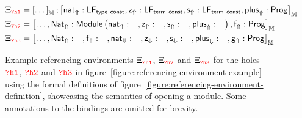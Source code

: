 \begin{figure}[H]
\begin{equation*}
\begin{aligned}
\Xi_{\texttt{\verbhole{?h1}}} &= \left[\dots\right]_\Module; \left[\Public{\mathsf{nat}} : \mathsf{LF}_{\mathsf{type\ const}}, \Public{\mathsf{z}} : \mathsf{LF}_{\mathsf{term\ const}}, \Public{\mathsf{s}} : \mathsf{LF}_{\mathsf{term\ const}}, \Public{\mathsf{plus}} : \mathsf{Prog}\right]_\Module\\
\Xi_{\texttt{\verbhole{?h2}}} &= \left[\dots, \Public{\mathsf{Nat}} : \mathsf{Module}\left(\Public{\mathsf{nat}} : \_, \Public{\mathsf{z}} : \_, \Public{\mathsf{s}} : \_, \Public{\mathsf{plus}} : \_\right), \Public{\mathsf{f}} : \mathsf{Prog}\right]_\Module\\
\Xi_{\texttt{\verbhole{?h3}}} &= \left[\dots, \Public{\mathsf{Nat}} : \_, \Public{\mathsf{f}} : \_, \Private{\mathsf{nat}} : \_, \Private{\mathsf{z}} : \_, \Private{\mathsf{s}} : \_, \Private{\mathsf{plus}} : \_, \Public{\mathsf{g}} : \mathsf{Prog}\right]_\Module
\end{aligned}
\end{equation*}
\caption[Example referencing environments in the formalism]{%
Example referencing environments $\Xi_{\texttt{\verbhole{?h1}}}$, $\Xi_{\texttt{\verbhole{?h2}}}$ and $\Xi_{\texttt{\verbhole{?h3}}}$ for the holes $\texttt{\verbhole{?h1}}$, $\texttt{\verbhole{?h2}}$ and $\texttt{\verbhole{?h3}}$ in figure~\ref{figure:referencing-environment-example} using the formal definitions of figure~\ref{figure:referencing-environment-definition}, showcasing the semantics of opening a module.
Some annotations to the bindings are omitted for brevity.
}
\label{figure:example-reference-environment-formalism}
\end{figure}



